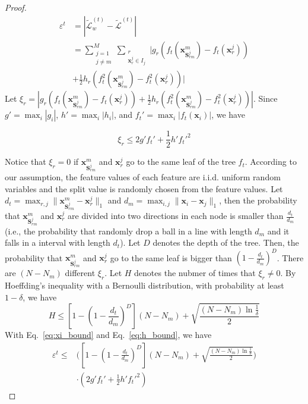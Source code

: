 \documentclass[letterpaper]{article} %
\theoremstyle{definition}
\newcommand\norm[1]{\lVert#1\rVert}
\newcommand{\mtx}[1]{\ensuremath{\mathbf{#1}}}
\begin{document}
\begin{proof}
\begin{equation}
\begin{aligned}
    \varepsilon^t &= |\mathcal{\tilde{L}}_w^{(t)} - \mathcal{\tilde{L}}^{(t)}| \\
    &= \sum_{\substack{j=1\\j\neq m}}^M\sum_{\substack{r\\\mathbf{x}_r^j\in I_j}}|g_r (f_t(\mathbf{x}_{\mtx{S}_{rm}^j}^m) - f_t(\mathbf{x}_r^j))\\
    &  +\frac{1}{2}h_r(f_t^2(\mathbf{x}_{\mtx{S}_{rm}^j}^m)-f_t^2(\mathbf{x}_r^j))|
\end{aligned}
\end{equation}
Let $\xi_r = |g_r (f_t(\mathbf{x}_{\mtx{S}_{rm}^j}^m) - f_t(\mathbf{x}_r^j))+\frac{1}{2}h_r(f_t^2(\mathbf{x}_{\mtx{S}_{rm}^j}^m)-f_t^2(\mathbf{x}_r^j))|$. Since $g'=\max_i |g_i|$, $h'=\max_i |h_i|$, and $f_t'=\max_i |f_t(\mathbf{x}_i)|$, we have

\begin{equation}
\label{eq:xi_bound}
    \xi_r \leq 2g' f_t'+\frac{1}{2}h' f_t'^2
\end{equation}

Notice that $\xi_r = 0$ if $\mathbf{x}_{\mtx{S}_{rm}^j}^m$ and $\mathbf{x}_r^j$ go to the same leaf of the tree $f_t$. According to our assumption, the feature values of each feature are i.i.d. uniform random variables and the split value is randomly chosen from the feature values. Let $d_t = \max_{r,j}\norm{\mathbf{x}_{\mtx{S}_{rm}^j}^m-\mathbf{x}_r^j}_1$ and $d_{m} = \max_{i,j}\norm{\mathbf{x}_i- \mathbf{x}_j}_1$, then the probability that $\mathbf{x}_{\mtx{S}_{rm}^j}^m$ and $\mathbf{x}_r^j$ are divided into two directions in each node is smaller than $\frac{d_t}{d_{m}}$ (i.e., the probability that randomly drop a ball in a line with length $d_m$ and it falls in a interval with length $d_t$). Let $D$ denotes the depth of the tree. Then, the probability that $\mathbf{x}_{\mtx{S}_{rm}^j}^m$ and $\mathbf{x}_r^j$ go to the same leaf is bigger than $(1-\frac{d_t}{d_{m}})^D$. There are $(N-N_m)$ different $\xi_r$. Let $H$ denotes the nubmer of times that $\xi_r\neq0$. By Hoeffding's inequality with a Bernoulli distribution, with probability at least $1-\delta$, we have
\begin{equation}
\label{eq:h_bound}
    H \leq [1-(1-\frac{d_t}{d_m})^D](N-N_m)+\sqrt{\frac{(N-N_m)\ln{\frac{1}{\delta}}}{2}}
\end{equation}
With Eq.~\eqref{eq:xi_bound} and Eq.~\eqref{eq:h_bound}, we have
\begin{equation}
\begin{aligned}
    \label{eq:errbound}
    \varepsilon^t \leq &\Big([1-(1-\frac{d_t}{d_m})^D](N-N_m)+\sqrt{\frac{(N-N_m)\ln{\frac{1}{\delta}}}{2}}\Big) \\
    &\cdot (2g' f_t'+\frac{1}{2}h' f_t'^2)
\end{aligned}
\end{equation}

\end{proof}
\end{document}
